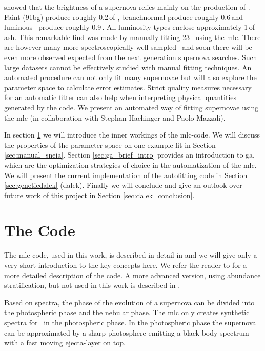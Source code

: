  \cite{2007Sci...315..825M} showed that the brightness of a supernova relies mainly on the production of \Ni. Faint \sneia (\gls{91bg}) produce roughly 0.2\,\msun of \Ni, \gls{branchnormal} \sneia produce roughly 0.6\,\msun and luminous \sneia\ produce roughly 0.9\,\msun. All luminosity types enclose approximately 1\,\msun of ash. This remarkable find was made by manually fitting 23 \sneia\ using the \gls{mlc}. There are however many more spectroscopically well sampled \sneia\ and soon there will be even more observed expected from the next generation supernova searches. Such large datasets cannot be effectively studied with manual fitting techniques. An automated procedure can not only fit many supernovae but will also explore the parameter space to calculate error estimates. Strict quality measures necessary for an automatic fitter can also help when interpreting physical quantities generated by the code. We present an automated way of fitting supernovae using the  \gls{mlc} (in collaboration with Stephan Hachinger and Paolo Mazzali).

In section \ref{sec:mlc_intro} we will introduce the inner workings of the \gls{mlc}-code.  We will discuss the properties of the parameter space on one example fit in Section \ref{sec:manual_sneia}. Section \ref{sec:ga_brief_intro} provides an introduction to \gls{ga}, which are the optimization strategies of choice in the automatization of the \gls{mlc}.  We will present the current implementation of the autofitting code in Section \ref{sec:geneticdalek} (\gls{dalek}).  Finally we will conclude and give an outlook over future work of this project in Section \ref{sec:dalek_conclusion}.

\section{The  Code}
\label{sec:mlc_intro}

The \gls{mlc} code, used in this work, is described in detail in \citet{2000A&A...363..705M} and we will give only a very short introduction to the key concepts here. We refer the reader to \citet{2000A&A...363..705M} for a more detailed description of the code. A more advanced version, using abundance stratification, but not used in this work  is described in \citet{2000A&A...363..705M}. 

Based on spectra, the phase of the evolution of a supernova can be divided into the photospheric phase and the nebular phase. The \gls{mlc} only creates synthetic spectra for \snia\ in the photospheric phase. In the photospheric phase the supernova can be approximated by a sharp photosphere emitting a black-body spectrum with a fast moving ejecta-layer on top.


